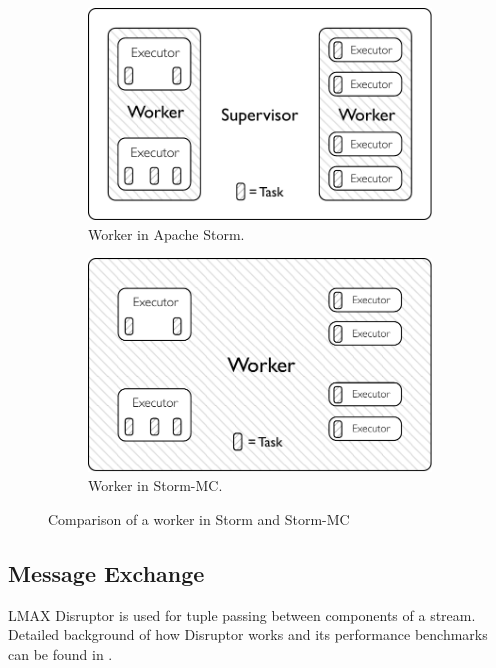 \documentclass[bsc,logo,frontabs,twoside,singlespacing,normalheadings,parskip]{infthesis}     %
\begin{document}
\begin{figure}
\centering
\begin{subfigure}{.5\textwidth}
  \centering
  \includegraphics[width=0.95\linewidth]{pdf/distributed_worker.pdf}
  \caption{Worker in Apache Storm.}
  \label{fig:comparison1}
\end{subfigure}%
\begin{subfigure}{.5\textwidth}
  \centering
  \includegraphics[width=0.95\linewidth]{pdf/local_worker.pdf}
  \caption{Worker in Storm-MC.}
  \label{fig:comparison2}
\end{subfigure}
\caption{Comparison of a worker in Storm and Storm-MC}
\label{fig:comparison}
\end{figure}

\subsection{Message Exchange}

LMAX Disruptor is used for tuple passing between components of a stream. Detailed background of how Disruptor works and its performance benchmarks can be found in \cite{Thompson_Farley_Barker_Gee_Stewart_2011}.
\end{document}
